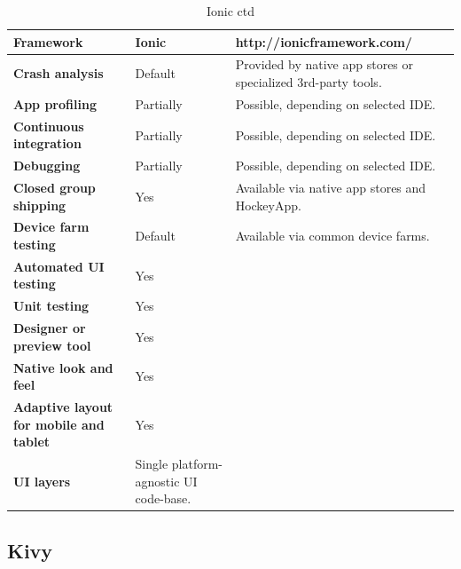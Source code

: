 \documentclass[english,master,public,dept460,male,cpdeclaration,oneside]{diploma}
\begin{document}
\begin{table}[!h]
	\centering
	\caption{Ionic ctd}
	\begin{tabular}{p{} | p{} | p{}}
		\toprule		
		\textbf{Framework} & \textbf{Ionic} & http://ionicframework.com/ \\
		\midrule
		\textbf{Crash analysis} & Default & Provided by native app stores or specialized 3rd-party tools. \\			
		\midrule
		\textbf{App profiling} & Partially & Possible, depending on selected IDE. \\			
		\midrule
		\textbf{Continuous integration} & Partially & Possible, depending on selected IDE. \\			
		\midrule
		\textbf{Debugging} & Partially & Possible, depending on selected IDE. \\			
		\midrule
		\textbf{Closed group shipping} & Yes & Available via native app stores and HockeyApp. \\			
		\midrule
		\textbf{Device farm testing} & Default & Available via common device farms. \\			
		\midrule
		\textbf{Automated UI testing} & Yes & \\			
		\midrule
		\textbf{Unit testing} & Yes & \\			
		\midrule
		\textbf{Designer or preview tool} & Yes & \\			
		\midrule
		\textbf{Native look and feel} & Yes & \\			
		\midrule
		\textbf{Adaptive layout for mobile and tablet} & Yes & \\			
		\midrule		
		\textbf{UI layers} & Single platform-agnostic UI code-base. &  \\			
		\midrule
	\end{tabular}
\end{table}

\clearpage
\subsection{Kivy}
\end{document}
